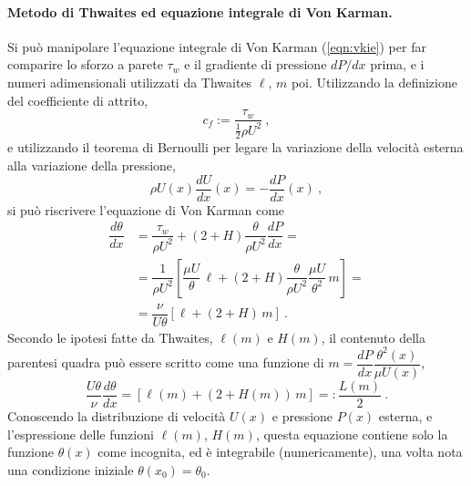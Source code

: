 \paragraph{Metodo di Thwaites ed equazione integrale di Von Karman.}
Si può manipolare l'equazione integrale di Von Karman (\ref{eqn:vkie}) per far comparire lo sforzo a parete $\tau_w$ e il gradiente di pressione $dP/dx$ prima, e i numeri adimensionali utilizzati da Thwaites $\ell$, $m$ poi.
%
Utilizzando la definizione del coefficiente di attrito,
\begin{equation}
 c_f := \dfrac{\tau_w}{\frac{1}{2}\rho U^2} \ ,
\end{equation}
e utilizzando il teorema di Bernoulli per legare la variazione della velocità esterna alla variazione della pressione,
\begin{equation}
 \rho U(x) \dfrac{dU}{dx}(x) = - \dfrac{dP}{dx}(x) \ ,
\end{equation}
si può riscrivere l'equazione di Von Karman come
\begin{equation}
\begin{aligned}
 \dfrac{d\theta}{dx} & = \dfrac{\tau_w}{\rho U^2} + ( 2 + H ) \dfrac{\theta}{\rho U^2}\dfrac{dP}{dx} = \\
  & = \dfrac{1}{\rho U^2} \left[ \dfrac{\mu U}{\theta} \, \ell + ( 2 + H ) \dfrac{\theta}{\rho U^2} \dfrac{\mu U}{\theta^2} \, m \right] = \\
  & = \dfrac{\nu}{U\theta} \left[  \ell + ( 2 + H ) \, m \right] \ .
\end{aligned}
\end{equation}
Secondo le ipotesi fatte da Thwaites, $\ell(m)$ e $H(m)$, il contenuto della parentesi quadra può essere scritto come una funzione di $m = \dfrac{dP}{dx} \dfrac{\theta^2(x)}{\mu U(x)}$,
\begin{equation}\label{eqn:vkie:2}
 \dfrac{U\theta}{\nu} \dfrac{d\theta}{dx} = [ \ell(m) + ( 2 + H(m) ) \, m ] =: \dfrac{L(m)}{2} \ .
\end{equation}
Conoscendo la distribuzione di velocità $U(x)$ e pressione $P(x)$ esterna, e l'espressione delle funzioni $\ell(m)$, $H(m)$, questa equazione contiene solo la funzione $\theta(x)$ come incognita, ed è integrabile (numericamente), una volta nota una condizione iniziale $\theta(x_0) = \theta_0$.

